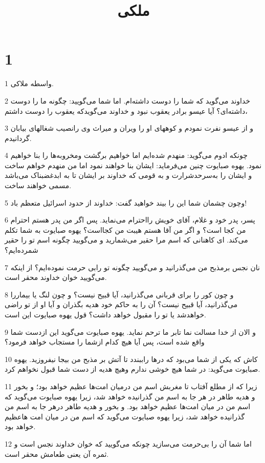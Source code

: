

\title{ملکی}


\chapter{1}

\par 1 واسطه ملاکی.
\par 2 خداوند می‌گوید که شما را دوست داشته‌ام. اما شما می‌گویید: چگونه ما را دوست داشته‌ای؟ آیا عیسو برادر یعقوب نبود و خداوند می‌گویدکه یعقوب را دوست داشتم،
\par 3 و از عیسو نفرت نمودم و کوههای او را ویران و میراث وی رانصیب شغالهای بیابان گردانیدم.
\par 4 چونکه ادوم می‌گوید: منهدم شده‌ایم اما خواهیم برگشت ومخروبه‌ها را بنا خواهیم نمود. یهوه صبایوت چنین می‌فرماید: ایشان بنا خواهند نمود اما من منهدم خواهم ساخت و ایشان را به‌سرحدشرارت و به قومی که خداوند بر ایشان تا به ابدغضبناک می‌باشد مسمی خواهند ساخت.
\par 5 وچون چشمان شما این را بیند خواهید گفت: خداوند از حدود اسرائیل متعظم باد!
\par 6 پسر، پدر خود و غلام، آقای خویش رااحترام می‌نماید. پس اگر من پدر هستم احترام من کجا است؟ و اگر من آقا هستم هیبت من کجااست؟ یهوه صبایوت به شما تکلم می‌کند. ای کاهنانی که اسم مرا حقیر می‌شمارید و می‌گویید چگونه اسم تو را حقیر شمرده‌ایم؟
\par 7 نان نجس برمذبح من می‌گذرانید و می‌گویید چگونه تو رابی حرمت نموده‌ایم؟ از اینکه می‌گویید خوان خداوند محقر است.
\par 8 و چون کور را برای قربانی می‌گذرانید، آیا قبیح نیست؟ و چون لنگ یا بیماررا می‌گذرانید، آیا قبیح نیست؟ آن را به حاکم خود هدیه بگذران و آیا او از تو راضی خواهدشد یا تو را مقبول خواهد داشت؟ قول یهوه صبایوت این است.
\par 9 و الان از خدا مسالت نما تابر ما ترحم نماید. یهوه صبایوت می‌گوید این ازدست شما واقع شده است، پس آیا هیچ کدام ازشما را مستجاب خواهد فرمود؟
\par 10 کاش که یکی از شما می‌بود که درها راببندد تا آتش بر مذبح من بیجا نیفروزید. یهوه صبایوت می‌گوید: در شما هیچ خوشی ندارم وهیچ هدیه از دست شما قبول نخواهم کرد.
\par 11 زیرا که از مطلع آفتاب تا مغربش اسم من درمیان امت‌ها عظیم خواهد بود؛ و بخور و هدیه طاهر در هر جا به اسم من گذرانیده خواهد شد، زیرا یهوه صبایوت می‌گوید که اسم من در میان امت‌ها عظیم خواهد بود. و بخور و هدیه طاهر درهر جا به اسم من گذرانیده خواهد شد، زیرا یهوه صبایوت می‌گوید که اسم من در میان امت هاعظیم خواهد بود.
\par 12 اما شما آن را بی‌حرمت می‌سازید چونکه می‌گویید که خوان خداوند نجس است و ثمره آن یعنی طعامش محقر است.
